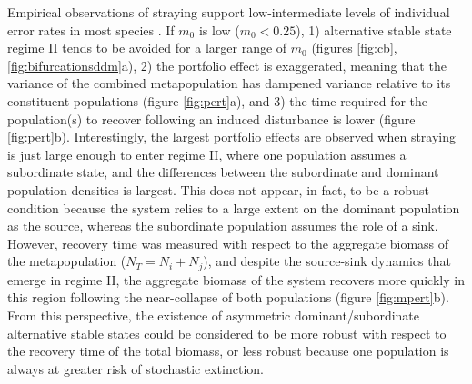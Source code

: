 \documentclass{revtex4}
\begin{document}
Empirical observations of straying support low-intermediate levels of individual error rates in most species \citep{H:2013fs,Keefer:2014gg}.
If $m_0$ is low ($m_0<0.25$),
1) alternative stable state regime II tends to be avoided for a larger range of $m_0$ (figures \ref{fig:cb}, \ref{fig:bifurcationsddm}a),
2) the portfolio effect is exaggerated, meaning that the variance of the combined metapopulation has dampened variance relative to its constituent populations (figure \ref{fig:pert}a), and
3) the time required for the population(s) to recover following an induced disturbance is lower (figure \ref{fig:pert}b).
Interestingly, the largest portfolio effects are observed when straying is just large enough to enter regime II, where one population assumes a subordinate state, and the differences between the subordinate and dominant population densities is largest.
This does not appear, in fact, to be a robust condition because the system relies to a large extent on the dominant population as the source, whereas the subordinate population assumes the role of a sink.
However, recovery time was measured with respect to the aggregate biomass of the metapopulation ($N_T = N_i + N_j$), and despite the source-sink dynamics that emerge in regime II, the aggregate biomass of the system recovers more quickly in this region following the near-collapse of both populations (figure \ref{fig:mpert}b).
From this perspective, the existence of asymmetric dominant/subordinate alternative stable states could be considered to be more robust with respect to the recovery time of the total biomass, or less robust because one population is always at greater risk of stochastic extinction.
\end{document}
